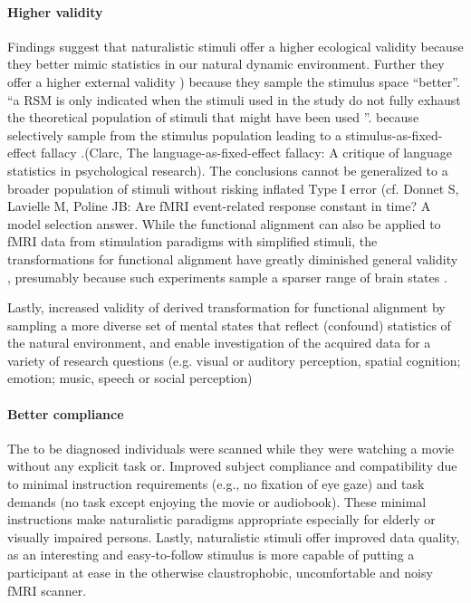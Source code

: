 \paragraph{Higher validity}
%
Findings suggest that naturalistic stimuli offer a higher ecological validity
\citep{hasson2004intersubject} because they better mimic statistics in our
natural dynamic environment.
%
Further they offer a higher external validity \citep{westfall2016fixing})
because they sample the stimulus space ``better''.
%
``a RSM is only indicated when the stimuli used in the study do not fully
exhaust the theoretical population of stimuli that might have been used
\citep{westfall2016fixing}''.
%
because selectively sample from the stimulus population leading to a
stimulus-as-fixed-effect fallacy \citep{westfall2016fixing}.(Clarc, The
language-as-fixed-effect fallacy: A critique of language statistics in
psychological research).
%
The conclusions cannot be generalized to a broader population of stimuli without
risking inflated Type I error  (cf. Donnet S, Lavielle
M, Poline JB: Are fMRI event-related response constant in time? A model
selection answer\citep{westfall2016fixing}.
%
While the functional alignment can also be applied to fMRI data from stimulation
paradigms with simplified stimuli, the transformations for functional alignment
have greatly diminished general validity \citep{haxby2011common}, presumably
because such experiments sample a sparser range of brain states
\citep{guntupalli2016model}.

%
Lastly, increased validity of derived transformation for functional alignment by
sampling a more diverse set of mental states that reflect (confound) statistics
of the natural environment, and enable investigation of the acquired data for a
variety of research questions (e.g. visual or auditory perception, spatial
cognition; emotion; music, speech or social perception)


\paragraph{Better compliance}

%
The to be diagnosed individuals were scanned while they were watching a movie
without any explicit task or.
%
Improved subject compliance and compatibility due to minimal instruction
requirements (e.g., no fixation of eye gaze) and task demands (no task except
enjoying the movie or audiobook).
%
These minimal instructions make naturalistic paradigms appropriate especially
for elderly or visually impaired persons.
%
Lastly, naturalistic stimuli offer improved data quality, as an interesting and
easy-to-follow stimulus is more capable of putting a participant at ease in the
otherwise claustrophobic, uncomfortable and noisy fMRI scanner.

